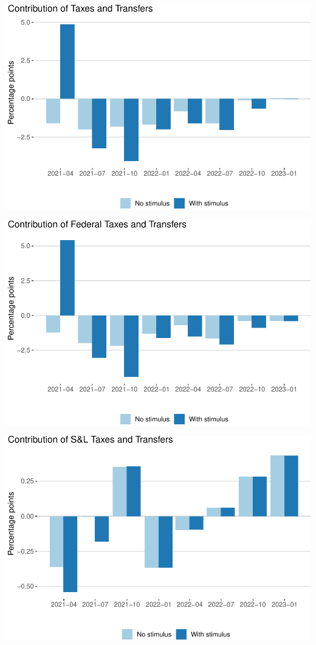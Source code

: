 \documentclass[
]{article}
\begin{document}
\begin{center}\includegraphics{stimulus-changes_files/figure-latex/tts-1} \end{center}

\begin{center}\includegraphics{stimulus-changes_files/figure-latex/federal-tts-1} \end{center}

\begin{center}\includegraphics{stimulus-changes_files/figure-latex/state-tts-1} \end{center}
\end{document}
